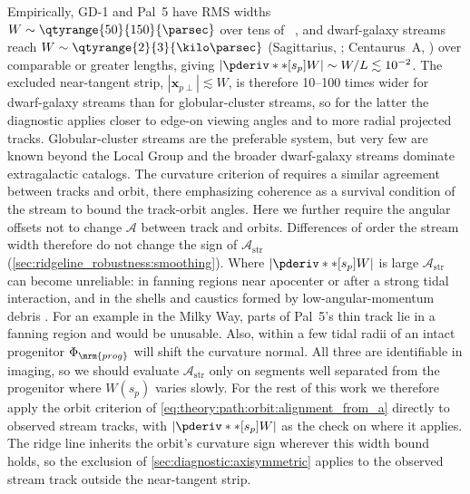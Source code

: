 \documentclass[linenumbers,twocolumn]{aastex701}
\renewcommand{\mbf}[1]{\boldsymbol{#1}}
\newcommand{\xvec}{\mbf{x}}  %
\newcommand{\Astr}{\mathcal{A}_{\mathrm{str}}}
\newcommand{\sarc}{s}  %
\newcommand{\proj}[1]{{#1}_{p}}  %
\newcommand{\projperp}[1]{{#1}_{p \perp}}  %
\newcommand{\xskyperp}{\projperp{\xvec}}
\newcommand{\ssky}{\proj{\sarc}} %
\begin{document}
        Empirically, GD-1 and Pal~5 have RMS widths $W\sim \qtyrange{50}{150}{\parsec}$ over tens of \kpc\ \citep{Koposov+:2010:ConstrainingMilkyWay, Erkal+:2017:SharperViewPal5, Bonaca+:2020:VariationsWidthDensity}, and dwarf-galaxy streams reach $W\sim \qtyrange{2}{3}{\kilo\parsec}$ (Sagittarius, \citealt{Correnti+:2010:NorthernWrapsSagittarius}; Centaurus~A, \citealt{Pearson:2022:MappingDarkMatter}) over comparable or greater lengths, giving $|\pderiv**[\ssky]{W}|\sim W/L\lesssim 10^{-2}$. %
        The excluded near-tangent strip, $|\xskyperp| \lesssim W$, is therefore \numrange{10}{100} times wider for dwarf-galaxy streams than for globular-cluster streams, so for the latter the diagnostic applies closer to edge-on viewing angles and to more radial projected tracks. %
        Globular-cluster streams are the preferable system, but very few are known beyond the Local Group \citep{KielHolm+:2026:EvidenceForFirstGCStellarStream} and the broader dwarf-galaxy streams dominate extragalactic catalogs. %
        The curvature criterion of  requires a similar agreement between tracks and orbit, there emphasizing coherence as a survival condition of the stream to bound the track-orbit angles. %
        Here we further require the angular offsets not to change $\mathcal{A}$ between track and orbits. %
        Differences of order the stream width therefore do not change the sign of $\Astr$ (\autoref{sec:ridgeline_robustness:smoothing}). %
        Where $|\pderiv**[\ssky]{W}|$ is large $\Astr$ can become unreliable: in fanning regions near apocenter or after a strong tidal interaction, and in the shells and caustics formed by low-angular-momentum debris \citep{Hendel:2015:TidalDebrisMorphology}. %
        For an example in the Milky Way, parts of Pal~5's thin track lie in a fanning region \citep{Starkman+:2020:ExtendedPal5Stream, Pearson+:2015:TidalStreamMorphology} and would be unusable. %
        Also, within a few tidal radii of an intact progenitor $\Phi_{\mrm{prog}}$ will shift the curvature normal. %
        All three are identifiable in imaging, so we should evaluate $\Astr$ only on segments well separated from the progenitor where $W(\ssky)$ varies slowly. %
        For the rest of this work we therefore apply the orbit criterion of \cref{eq:theory:path:orbit:alignment_from_a} directly to observed stream tracks, with $|\pderiv**[\ssky]{W}|$ as the check on where it applies. %
        The ridge line inherits the orbit's curvature sign wherever this width bound holds, so the exclusion of \autoref{sec:diagnostic:axisymmetric} applies to the observed stream track outside the near-tangent strip. %
\end{document}
